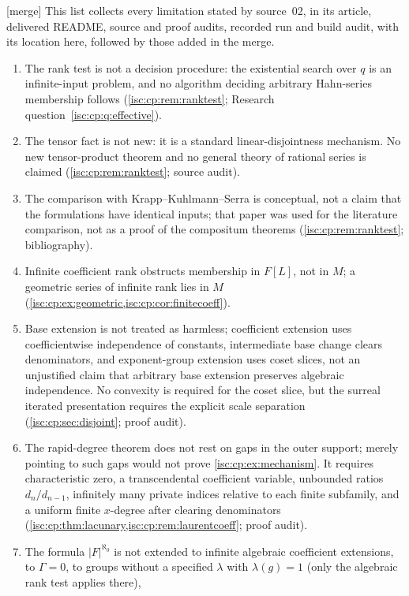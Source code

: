 \documentclass[11pt,letterpaper]{article}
\theoremstyle{definition}
\theoremstyle{remark}
\newcommand{\mtag}{\textup{[merge]}}%
\numberwithin{equation}{section}
\begin{document}
\mtag{} This list collects every limitation stated by source~02, in its
article, delivered README, source and proof audits, recorded run and build
audit, with its location here, followed by those added in the merge.
\begin{enumerate}[label=C\arabic*.,leftmargin=2.6em,itemsep=2pt]
\item The rank test is not a decision procedure: the existential search
over $q$ is an infinite-input problem, and no algorithm deciding arbitrary
Hahn-series membership follows (\cref{isc:cp:rem:ranktest};
Research question~\ref{isc:cp:q:effective}).
\item The tensor fact is not new: it is a standard linear-disjointness
mechanism. No new tensor-product theorem and no general theory of rational
series is claimed (\cref{isc:cp:rem:ranktest}; source audit).
\item The comparison with Krapp--Kuhlmann--Serra \cite{KKS} is conceptual,
not a claim that the formulations have identical inputs; that paper was
used for the literature comparison, not as a proof of the compositum
theorems (\cref{isc:cp:rem:ranktest}; bibliography).
\item Infinite coefficient rank obstructs membership in $F[L]$, not in $M$;
a geometric series of infinite rank lies in $M$
(\cref{isc:cp:ex:geometric,isc:cp:cor:finitecoeff}).
\item Base extension is not treated as harmless; coefficient extension uses
coefficientwise independence of constants, intermediate base change clears
denominators, and exponent-group extension uses coset slices, not an
unjustified claim that arbitrary base extension preserves algebraic
independence. No convexity is required for the coset slice, but the
surreal iterated presentation requires the explicit scale separation
(\cref{isc:cp:sec:disjoint}; proof audit).
\item The rapid-degree theorem does not rest on gaps in the outer support;
merely pointing to such gaps would not prove \cref{isc:cp:ex:mechanism}. It
requires characteristic zero, a transcendental coefficient variable,
unbounded ratios $d_n/d_{n-1}$, infinitely many private indices relative to
each finite subfamily, and a uniform finite $x$-degree after clearing
denominators (\cref{isc:cp:thm:lacunary,isc:cp:rem:laurentcoeff}; proof
audit).
\item The formula $|F|^{\aleph_0}$ is not extended to infinite algebraic
coefficient extensions, to $\Gamma=0$, to groups without a specified
$\lambda$ with $\lambda(g)=1$ (only the algebraic rank test applies there),

\end{enumerate}
\end{document}
